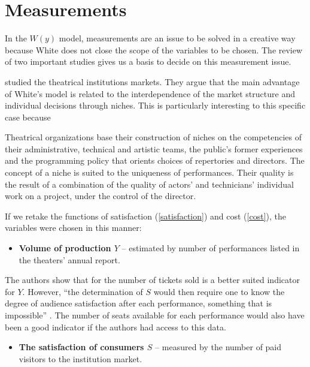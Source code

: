 \documentclass[a4paper, 12pt, openright, oneside, german, french, brazil, english]{abntex2}
\begin{document}
	\section{Measurements}
	
	In the $W(y)$ model, measurements are an issue to be solved in a creative way because White does not close the scope of the variables to be chosen. The review of two important studies gives us a basis to decide on this measurement issue.
	
	 studied the theatrical institutions markets. They argue that the main advantage of White's model is related to the interdependence of the market structure and individual decisions through niches. This is particularly interesting to this specific case because
	
	\begin{citacao}
		Theatrical organizations base their construction of niches on the competencies of their administrative, technical and artistic teams, the public's former experiences and the programming policy that orients choices of repertories and directors. The concept of a niche is suited to the uniqueness of performances. Their quality is the result of a combination of the quality of actors' and technicians' individual work on a project, under the control of the director. \cite[p. 255]{biencourt2002market}
	\end{citacao}
	
	
	If we retake the functions of satisfaction (\ref{satisfaction}) and cost (\ref{cost}), the variables were chosen in this manner:
	
	\begin{itemize}
		\item \textbf{Volume of production $Y$} -- estimated by number of performances listed in the theaters' annual report.
	\end{itemize}

	The authors show that for  the number of tickets sold is a better suited indicator for $Y$. However, ``the determination of $S$ would then require one to know the degree of audience satisfaction after each performance, something that is impossible'' \cite[p. 264]{biencourt2002market}. The number of seats available for each performance would also have been a good indicator if the authors had access to this data.
	
	\begin{itemize}
		\item \textbf{The satisfaction of consumers $S$} -- measured by the number of paid visitors to the institution market.
	\end{itemize}
	
\end{document}
